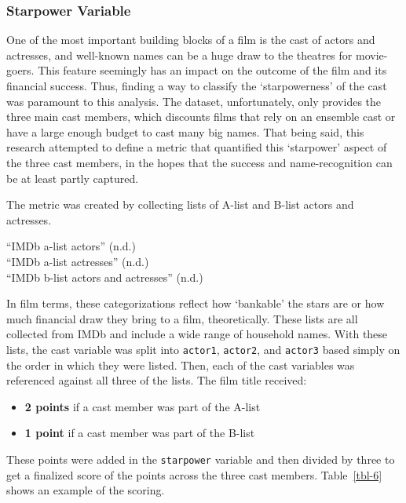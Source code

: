 \documentclass[
]{agujournal2019}
\providecommand{\tightlist}{%
  \setlength{\itemsep}{0pt}\setlength{\parskip}{0pt}}\usepackage{longtable,booktabs,array}
\begin{document}
\subsubsection{Starpower Variable}\label{starpower-variable}

One of the most important building blocks of a film is the cast of
actors and actresses, and well-known names can be a huge draw to the
theatres for movie-goers. This feature seemingly has an impact on the
outcome of the film and its financial success. Thus, finding a way to
classify the `starpowerness' of the cast was paramount to this analysis.
The dataset, unfortunately, only provides the three main cast members,
which discounts films that rely on an ensemble cast or have a large
enough budget to cast many big names. That being said, this research
attempted to define a metric that quantified this `starpower' aspect of
the three cast members, in the hopes that the success and
name-recognition can be at least partly captured.

The metric was created by collecting lists of A-list and B-list actors
and actresses.

{``IMDb a-list actors''} (n.d.)\\
{``IMDb a-list actresses''} (n.d.)\\
{``IMDb b-list actors and actresses''} (n.d.)

In film terms, these categorizations reflect how `bankable' the stars
are or how much financial draw they bring to a film, theoretically.
These lists are all collected from IMDb and include a wide range of
household names. With these lists, the cast variable was split into
\texttt{actor1}, \texttt{actor2}, and \texttt{actor3} based simply on
the order in which they were listed. Then, each of the cast variables
was referenced against all three of the lists. The film title received:

\begin{itemize}
\tightlist
\item
  \textbf{2 points} if a cast member was part of the A-list\\
\item
  \textbf{1 point} if a cast member was part of the B-list
\end{itemize}

These points were added in the \texttt{starpower} variable and then
divided by three to get a finalized score of the points across the three
cast members. Table~\ref{tbl-6} shows an example of the scoring.
\end{document}
